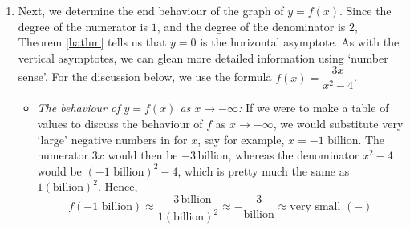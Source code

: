 {\begin{enumerate}
\begin{itemize}
\item  \textit{The behaviour of $y=f(x)$ as $x \rightarrow 2$:} Consider $x \rightarrow 2^{-}$. We imagine substituting $x = 1.999999$.  Approximating $f(x)$ as we did above, we get 
\begin{align*}
f(x) &\approx \dfrac{6}{\left( \mbox{very small $(-)$}\right)(4)} = \dfrac{3}{2 \left( \mbox{very small $(-)$}\right)}\\
  &\approx \dfrac{3}{\mbox{very small $(-)$}} \approx \mbox{very big $(-)$}
\end{align*}
We conclude that as $x \rightarrow 2^{-}$, $f(x) \rightarrow -\infty$.  Similarly, as $x \rightarrow 2^{+}$, we imagine substituting $x = 2.000001$ to get $f(x) \approx \frac{3}{\mbox{\scriptsize very small $(+)$}} \approx \mbox{very big (+)}$.  So as $x \rightarrow 2^{+}, f(x) \rightarrow \infty$.
\end{itemize}

The appearance of the graph $y=f(x)$  near $x=-2$ and $x=2$ is shown in Figure \ref{fig:ratgraph2}.



\item  Next, we determine the end behaviour of the graph of $y=f(x)$.  Since the degree of the numerator is $1$, and the degree of the denominator is $2$, Theorem \ref{hathm} tells us that $y=0$ is the horizontal asymptote.  As with the vertical asymptotes, we can glean more detailed information using `number sense'. For the discussion below, we use the formula $f(x) = \dfrac{3x}{x^2-4}$. 

\begin{itemize}

\item  \textit{The behaviour of $y=f(x)$ as $x \rightarrow -\infty$:}  If we were to make a table of values to discuss the behaviour of $f$ as $x \rightarrow -\infty$, we would substitute very `large' negative numbers in for $x$, say for example, $x = \mbox{$-1$ billion}$.  The numerator $3x$ would then be $-3 \, \mbox{billion}$, whereas the denominator $x^2-4$ would be $(\mbox{$-1$ billion})^2 - 4$, which is pretty much the same as  $1(\mbox{billion})^2$.  Hence, 
\[f\left(\mbox{$-1$ billion}\right) \approx \dfrac{-3 \, \mbox{billion}}{1(\mbox{billion})^2} \approx - \dfrac{3}{\mbox{billion}} \approx \mbox{very small $(-)$} \]


\end{itemize}
\end{enumerate}}
